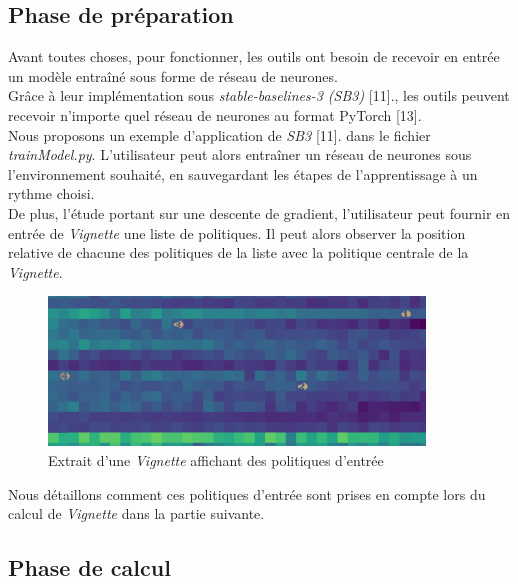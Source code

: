 \documentclass[12pt]{article}
\begin{document}
\subsection{Phase de préparation}

Avant toutes choses, pour fonctionner, les outils ont besoin de recevoir en entrée un modèle entraîné sous forme de réseau de neurones. \\

Grâce à leur implémentation sous \emph{stable-baselines-3 (SB3)} [11]., les outils peuvent recevoir n'importe quel réseau de neurones au format PyTorch [13]. \\

Nous proposons un exemple d'application de \emph{SB3} [11].
 dans le fichier \emph{trainModel.py}. L'utilisateur peut alors entraîner un réseau de neurones sous l'environnement souhaité, en sauvegardant les étapes de l'apprentissage à un rythme choisi. \\

De plus, l'étude portant sur une descente de gradient, l'utilisateur peut fournir en entrée de \emph{Vignette} une liste de politiques. Il peut alors observer la position relative de chacune des politiques de la liste avec la politique centrale de la \emph{Vignette}. \\

\begin{figure}[htp]
    \centering
    \includegraphics[width=10cm]{Images/politiques_entrees_vignette}
    \caption{Extrait d'une \emph{Vignette} affichant des politiques d'entrée}
    \label{fig:exempleEntree}
\end{figure}

Nous détaillons comment ces politiques d'entrée sont prises en compte lors du calcul de \emph{Vignette} dans la partie suivante. \\

\subsection{Phase de calcul}
\end{document}
